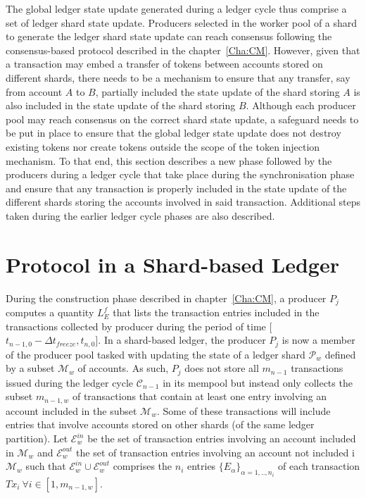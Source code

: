 The global ledger state update generated during a ledger cycle thus comprise a set of ledger shard state update. Producers selected in the worker pool of a shard to generate the ledger shard state update can reach consensus following the consensus-based protocol described in the chapter~\ref{Cha:CM}. However, given that a transaction may embed a transfer of tokens between accounts stored on different shards, there needs to be a mechanism to ensure that any transfer, say from account $A$ to $B$, partially included the state update of the shard storing $A$ is also included in the state update of the shard storing $B$. Although each producer pool may reach consensus on the correct shard state update, a safeguard needs to be put in place to ensure that the global ledger state update does not destroy existing tokens nor create tokens outside the scope of the token injection mechanism. To that end, this section describes a new phase followed by the producers during a ledger cycle that take place during the synchronisation phase and ensure that any transaction is properly included in the state update of the different shards storing the accounts involved in said transaction.  Additional steps taken during the earlier ledger cycle phases are also described.

\section{Protocol in a Shard-based Ledger}

During the construction phase described in chapter~\ref{Cha:CM}, a producer $P_j$ computes a quantity $L_E^f$ that lists the transaction entries included in the transactions collected by producer during the period of time [$t_{n-1,0} - \Delta t_{freeze}, t_{n,0}$]. In a shard-based ledger, the producer $P_j$ is now a member of the producer pool tasked with updating the state of a ledger shard $\mathcal{P}_w$ defined by a subset $\mathcal{M}_w$ of accounts. As such, $P_j$ does not store all $m_{n-1}$ transactions issued during the ledger cycle $\mathcal{C}_{n-1}$ in its mempool but instead only collects the subset $m_{n-1,w}$ of transactions that contain at least one entry involving  an account included in the subset $\mathcal{M}_w$. Some of these transactions will include entries that involve accounts stored on other shards (of the same ledger partition). Let $\mathcal{E}^{in}_w$ be the set of transaction entries involving an account included in $\mathcal{M}_w$ and $\mathcal{E}^{out}_w$ the set of transaction entries involving  an account not included i $\mathcal{M}_w$ such that $\mathcal{E}^{in}_w \cup \mathcal{E}^{out}_w$ comprises the $n_i$ entries $\{E_\alpha\}_{\alpha=1,..,n_i}$ of each transaction $Tx_i~\forall i \in  [1, m_{n-1,w}]$.\\

